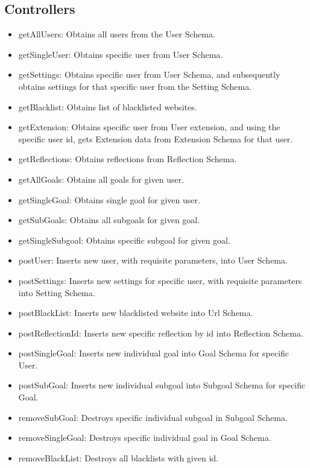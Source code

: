 \documentclass[letterpaper, 10 pt]{report}
\begin{document}
\subsection{Controllers}
\begin{itemize}
 \item getAllUsers: Obtains all users from the User Schema.
 \item getSingleUser: Obtains specific user from User Schema.
 \item getSettings: Obtains specific user from User Schema, and subsequently obtains settings for that specific user from the Setting Schema.
 \item getBlacklist: Obtains list of blacklisted websites.
 \item getExtension: Obtains specific user from User extension, and using the specific user id, gets Extension data from Extension Schema for that user.
 \item getReflections: Obtains reflections from Reflection Schema.
 \item getAllGoals: Obtains all goals for given user.
 \item getSingleGoal: Obtains single goal for given user.
 \item getSubGoals: Obtains all subgoals for given goal.
 \item getSingleSubgoal: Obtains specific subgoal for given goal.
 
 \item postUser: Inserts new user, with requisite parameters, into User Schema.
 \item postSettings: Inserts new settings for specific user, with requisite parameters into Setting Schema.
 \item postBlackList: Inserts new blacklisted website into Url Schema.
 \item postReflectionId: Inserts new specific reflection by id into Reflection Schema.
 \item postSingleGoal: Inserts new individual goal into Goal Schema for specific User.
 \item postSubGoal: Inserts new individual subgoal into Subgoal Schema for specific Goal.
 
 \item removeSubGoal: Destroys specific individual subgoal in Subgoal Schema.
 \item removeSingleGoal: Destroys specific individual goal in Goal Schema.
 \item removeBlackList: Destroys all blacklists with given id.
 

\end{itemize}
\end{document}
